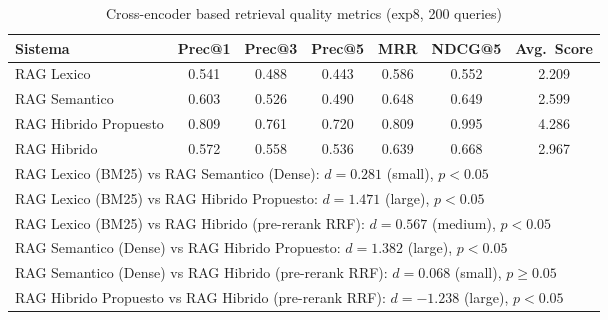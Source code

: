 \begin{table}[htbp]
\centering
\caption{Cross-encoder based retrieval quality metrics (exp8, 200 queries)}
\label{tab:retrieval-metrics}
\begin{tabular}{lcccccc}
\toprule
Sistema & Prec@1 & Prec@3 & Prec@5 & MRR & NDCG@5 & Avg.~Score \\
\midrule
RAG Lexico & 0.541 & 0.488 & 0.443 & 0.586 & 0.552 & 2.209 \\
RAG Semantico & 0.603 & 0.526 & 0.490 & 0.648 & 0.649 & 2.599 \\
RAG Hibrido Propuesto & 0.809 & 0.761 & 0.720 & 0.809 & 0.995 & 4.286 \\
RAG Hibrido & 0.572 & 0.558 & 0.536 & 0.639 & 0.668 & 2.967 \\
\midrule
\multicolumn{7}{l}{\footnotesize RAG Lexico (BM25) vs RAG Semantico (Dense): $d=0.281$ (small), $p<0.05$} \\
\multicolumn{7}{l}{\footnotesize RAG Lexico (BM25) vs RAG Hibrido Propuesto: $d=1.471$ (large), $p<0.05$} \\
\multicolumn{7}{l}{\footnotesize RAG Lexico (BM25) vs RAG Hibrido (pre-rerank RRF): $d=0.567$ (medium), $p<0.05$} \\
\multicolumn{7}{l}{\footnotesize RAG Semantico (Dense) vs RAG Hibrido Propuesto: $d=1.382$ (large), $p<0.05$} \\
\multicolumn{7}{l}{\footnotesize RAG Semantico (Dense) vs RAG Hibrido (pre-rerank RRF): $d=0.068$ (small), $p\geq0.05$} \\
\multicolumn{7}{l}{\footnotesize RAG Hibrido Propuesto vs RAG Hibrido (pre-rerank RRF): $d=-1.238$ (large), $p<0.05$} \\
\bottomrule
\end{tabular}
\end{table}